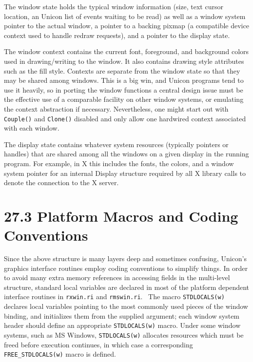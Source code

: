 The window state holds the typical window information (size, text
cursor location, an Unicon list of events waiting to be read) as well
as a window system pointer to the actual window, a pointer to a
backing pixmap (a {\textquotedbl}compatible device
context{\textquotedbl} used to handle redraw requests), and a pointer
to the display state.

The window context contains the current font, foreground, and
background colors used in drawing/writing to the window.  It also
contains drawing style attributes such as the fill style. Contexts are
separate from the window state so that they may be shared among
windows. This is a big win, and Unicon programs tend to use it
heavily, so in porting the window functions a central design issue
must be the effective use of a comparable facility on other window
systems, or emulating the context abstraction if
necessary. Nevertheless, one might start out with \texttt{Couple()}
and \texttt{Clone()} disabled and only allow one hardwired context
associated with each window.

The display state contains whatever system resources (typically
pointers or handles) that are shared among all the windows on a given
display in the running program. For example, in X this includes the
fonts, the colors, and a window system pointer for an internal Display
structure required by all X library calls to denote the connection to
the X server.


\section[27.3 Platform Macros and Coding Conventions]{27.3 Platform Macros and Coding Conventions}

Since the above structure is many layers deep and sometimes confusing,
Unicon's graphics interface routines employ coding conventions to
simplify things. In order to avoid many extra memory references in
accessing fields in the multi-level structure,
{\textquotedbl}standard{\textquotedbl} local variables are declared in
most of the platform dependent interface routines in \texttt{rxwin.ri}
and \texttt{rmswin.ri}. \ The macro \texttt{STDLOCALS(w)} declares
local variables pointing to the most commonly used pieces of the
window binding, and initializes them from the supplied argument; each
window system header should define an appropriate
\texttt{STDLOCALS(w)} macro. Under some window systems, such as MS
Windows, \texttt{STDLOCALS(w)} allocates resources which must be freed
before execution continues, in which case a corresponding
\texttt{FREE\_STDLOCALS(w)} macro is defined.


